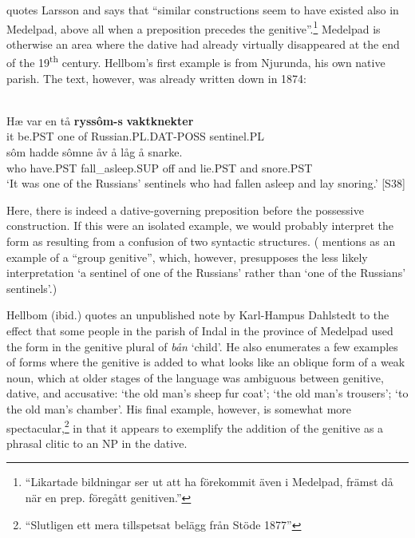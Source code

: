 \citet[126]{Hellbom1961} quotes Larsson and says that “similar constructions seem to have existed also in Medelpad, above all when a preposition precedes the genitive”.\footnote{ “Likartade bildningar ser ut att ha förekommit även i Medelpad, främst då när en prep. föregått genitiven.”} Medelpad is otherwise an area where the dative had already virtually disappeared at the end of the 19\textsuperscript{th} century. Hellbom’s first example is from Njurunda, his own native parish. The text, however, was already written down in 1874:

\ea\label{}
\\
\gll Hæ  var  en  tå  \textbf{ryssôm-s} \textbf{vaktknekter}\\
it  be.PST  one  of  Russian.PL.DAT-POSS  sentinel.PL\\
\gll sôm  hadde  sômne  åv  å  låg  å  snarke.\\
who  have.PST  fall\_asleep.SUP  off  and  lie.PST  and  snore.PST\\
\glt  ‘It was one of the Russians’ sentinels who had fallen asleep and lay snoring.’ [S38]
\z

Here, there is indeed a dative-governing preposition before the possessive construction. If this were an isolated example, we would probably interpret the form  as resulting from a confusion of two syntactic structures. (\citet[38]{Delsing2003a} mentions  as an example of a “group genitive”, which, however, presupposes the less likely interpretation ‘a sentinel of one of the Russians’ rather than ‘one of the Russians’ sentinels’.) 

Hellbom (ibid.) quotes an unpublished note by Karl-Hampus Dahlstedt to the effect that some people in the parish of Indal in the province of Medelpad used the form  in the genitive plural of \textit{bån} ‘child’. He also enumerates a few examples of forms where the genitive is added to what looks like an oblique form of a weak noun, which at older stages of the language was ambiguous between genitive, dative, and accusative:  ‘the old man’s sheep fur coat’;  ‘the old man’s trousers’;  ‘to the old man’s chamber’. His final example, however, is somewhat more spectacular,\footnote{ “Slutligen ett mera tillspetsat belägg från Stöde 1877”} in that it appears to exemplify the addition of the genitive as a phrasal clitic to an NP in the dative. 

